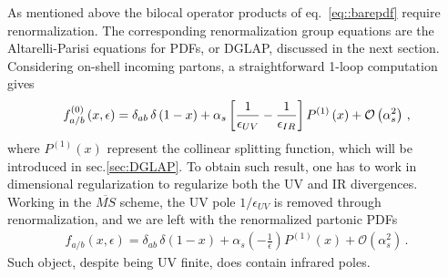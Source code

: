 %
As mentioned above the bilocal operator products of eq.~\eqref{eq::barepdf} require renormalization.
The corresponding renormalization group equations are the Altarelli-Parisi equations for PDFs, or 
DGLAP, discussed in the next section.
Considering on-shell incoming partons, a straightforward 1-loop computation gives
\begin{align}
    \label{eq:1-loop_bare_partonic_pdf}
    f^{{(0)}}_{a/b}\left(x,\epsilon\right) = \delta_{ab}\,\delta\left(1-x\right)
    + \alpha_s\left[\frac{1}{\epsilon_{UV}}-\frac{1}{\epsilon_{IR}}\right] P^{(1)}\left(x\right)
    + \mathcal{O}\left(\alpha_s^2\right)\,,
\end{align}
where $P^{(1)}\left(x\right)$ represent the collinear splitting function, which will be introduced
in sec.\ref{sec:DGLAP}.
To obtain such result, one has to work in dimensional regularization to regularize both the UV and IR
divergences. 
Working in the $\overline{MS}$ scheme, the UV pole $1/\epsilon_{UV}$ is removed through renormalization,
and we are left with the renormalized partonic PDFs
\begin{align}
    \label{eq:1-loop_renormalized_partonic_pdf}
    f_{a/b}\left(x,\epsilon\right) = \delta_{ab}\,\delta\left(1-x\right)
    + \alpha_s\left(-\frac{1}{\epsilon}\right) P^{(1)}\left(x\right)
    + \mathcal{O}\left(\alpha_s^2\right)\,.
\end{align}
Such object, despite being UV finite, does contain 
infrared poles.

